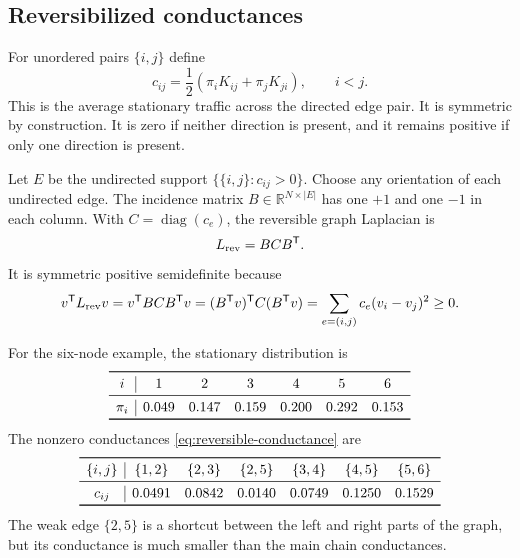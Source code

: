 \documentclass[11pt]{article}
\numberwithin{equation}{section}
\newcommand{\R}{\mathbb{R}}
\newcommand{\diag}{\operatorname{diag}}
\newcommand{\transpose}{^{\mathsf T}}
\newcommand{\half}{\frac{1}{2}}
\begin{document}
\subsection{Reversibilized conductances}

For unordered pairs $\{i,j\}$ define
\begin{equation}
  c_{ij}=\half(\pi_iK_{ij}+\pi_jK_{ji}),
  \qquad i<j.
  \label{eq:reversible-conductance}
\end{equation}
This is the average stationary traffic across the directed edge pair.  It is symmetric by construction.  It is zero if neither direction is present, and it remains positive if only one direction is present.

Let $E$ be the undirected support $\{\{i,j\}:c_{ij}>0\}$.  Choose any orientation of each undirected edge.  The incidence matrix $B\in\R^{N\times |E|}$ has one $+1$ and one $-1$ in each column.  With $C=\diag(c_e)$, the reversible graph Laplacian is
\begin{equation}
  L_{\rm rev}=BCB\transpose.
  \label{eq:Lrev}
\end{equation}
It is symmetric positive semidefinite because
\begin{equation}
  v\transpose L_{\rm rev}v
  =v\transpose BCB\transpose v
  =(B\transpose v)\transpose C(B\transpose v)
  =\sum_{e=(i,j)}c_e(v_i-v_j)^2\ge 0.
  \label{eq:Lrev-psd}
\end{equation}

\begin{runningexample}
For the six-node example, the stationary distribution is
\[
\begin{array}{c|cccccc}
\toprule
 i&1&2&3&4&5&6\\
\midrule
 \pi_i&0.049&0.147&0.159&0.200&0.292&0.153\\
\bottomrule
\end{array}
\]
The nonzero conductances \eqref{eq:reversible-conductance} are
\[
\begin{array}{c|cccccc}
\toprule
\{i,j\}&\{1,2\}&\{2,3\}&\{2,5\}&\{3,4\}&\{4,5\}&\{5,6\}\\
\midrule
c_{ij}&0.0491&0.0842&0.0140&0.0749&0.1250&0.1529\\
\bottomrule
\end{array}
\]
The weak edge $\{2,5\}$ is a shortcut between the left and right parts of the graph, but its conductance is much smaller than the main chain conductances.
\end{runningexample}
\end{document}
